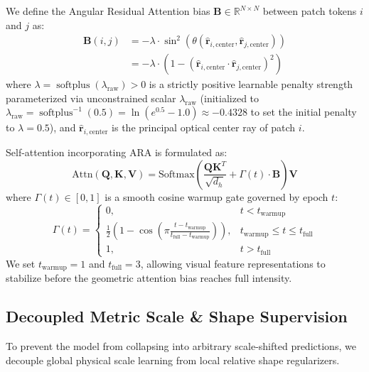 We define the Angular Residual Attention bias $\mathbf{B} \in \mathbb{R}^{N \times N}$ between patch tokens $i$ and $j$ as:
\begin{equation}
\begin{split}
    \mathbf{B}(i, j) &= -\lambda \cdot \sin^2(\theta(\hat{\mathbf{r}}_{i, \text{center}}, \hat{\mathbf{r}}_{j, \text{center}})) \\
    &= -\lambda \cdot \left( 1 - (\hat{\mathbf{r}}_{i, \text{center}} \cdot \hat{\mathbf{r}}_{j, \text{center}})^2 \right)
\end{split}
\label{eq:ara_bias}
\end{equation}
where $\lambda = \operatorname{softplus}(\lambda_{\text{raw}}) > 0$ is a strictly positive learnable penalty strength parameterized via unconstrained scalar $\lambda_{\text{raw}}$ (initialized to $\lambda_{\text{raw}} = \operatorname{softplus}^{-1}(0.5) = \ln(e^{0.5} - 1.0) \approx -0.4328$ to set the initial penalty to $\lambda = 0.5$), and $\hat{\mathbf{r}}_{i, \text{center}}$ is the principal optical center ray of patch $i$.

Self-attention incorporating ARA is formulated as:
\begin{equation}
    \text{Attn}(\mathbf{Q}, \mathbf{K}, \mathbf{V}) = \text{Softmax}\left( \frac{\mathbf{Q}\mathbf{K}^T}{\sqrt{d_h}} + \Gamma(t) \cdot \mathbf{B} \right) \mathbf{V}
\end{equation}
where $\Gamma(t) \in [0, 1]$ is a smooth cosine warmup gate governed by epoch $t$:
\begin{equation}
    \Gamma(t) = \begin{cases} 
      0, & t < t_{\text{warmup}} \\
      \frac{1}{2}\left(1 - \cos\left(\pi \frac{t - t_{\text{warmup}}}{t_{\text{full}} - t_{\text{warmup}}}\right)\right), & t_{\text{warmup}} \le t \le t_{\text{full}} \\
      1, & t > t_{\text{full}}
   \end{cases}
\end{equation}
We set $t_{\text{warmup}} = 1$ and $t_{\text{full}} = 3$, allowing visual feature representations to stabilize before the geometric attention bias reaches full intensity.

\subsection{Decoupled Metric Scale \& Shape Supervision}
To prevent the model from collapsing into arbitrary scale-shifted predictions, we decouple global physical scale learning from local relative shape regularizers.

